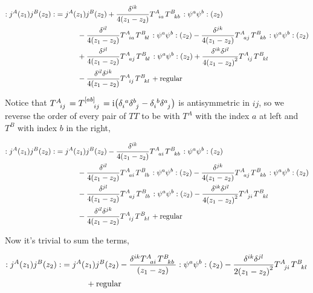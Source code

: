 \begin{align*}
    \cnord{j^A\qty(z_1)j^B\qty(z_2)}&=j^A\qty(z_1)j ^B\qty(z_2)+\frac{\delta^{ik}}{4\qty(z_1-z_2)}\tensor{T}{^A_{ia}}\tensor{T}{^B_{kb}}\cnord{\psi^a\psi^b}\qty(z_2)\\
    &\quad\quad\quad-\frac{\delta^{il}}{4\qty(z_1-z_2)}\tensor{T}{^A_{ia}}\tensor{T}{^B_{bl}}\cnord{\psi^a\psi^b}\qty(z_2)-\frac{\delta^{jk}}{4\qty(z_1-z_2)}\tensor{T}{^A_{aj}}\tensor{T}{^B_{kb}}\cnord{\psi^a\psi^b}\qty(z_2)\\
    &\quad\quad\quad+\frac{\delta^{jl}}{4\qty(z_1-z_2)}\tensor{T}{^A_{aj}}\tensor{T}{^B_{bl}}\cnord{\psi^a\psi^b}\qty(z_2)+\frac{\delta^{ik}\delta^{jl}}{4\qty(z_1-z_2)^2}\tensor{T}{^A_{ij}}\tensor{T}{^B_{kl}}\\
    &\quad\quad\quad-\frac{\delta^{il}\delta^{jk}}{4\qty(z_1-z_2)}\tensor{T}{^A_{ij}}\tensor{T}{^B_{kl}}+\textnormal{regular}
\end{align*}

Notice that $\tensor{T}{^A_{ij}}=\tensor{T}{^{\qty[ab]}_{ij}}=\im\qty(\tensor{\delta}{_i^a}\tensor{\delta}{^b_j}-\tensor{\delta}{_i^b}\tensor{\delta}{^a_j})$ is antisymmetric in $ij$, so we reverse the order of every pair of $TT$ to be with 
$T^A$ with the index $a$ at left and $T^B$ with index $b$ in the right,

\begin{align*}
    \cnord{j^A\qty(z_1)j^B\qty(z_2)}&=j^A\qty(z_1)j ^B\qty(z_2)-\frac{\delta^{ik}}{4\qty(z_1-z_2)}\tensor{T}{^A_{ai}}\tensor{T}{^B_{kb}}\cnord{\psi^a\psi^b}\qty(z_2)\\
    &\quad\quad\quad-\frac{\delta^{il}}{4\qty(z_1-z_2)}\tensor{T}{^A_{ai}}\tensor{T}{^B_{lb}}\cnord{\psi^a\psi^b}\qty(z_2)-\frac{\delta^{jk}}{4\qty(z_1-z_2)}\tensor{T}{^A_{aj}}\tensor{T}{^B_{kb}}\cnord{\psi^a\psi^b}\qty(z_2)\\
    &\quad\quad\quad-\frac{\delta^{jl}}{4\qty(z_1-z_2)}\tensor{T}{^A_{aj}}\tensor{T}{^B_{lb}}\cnord{\psi^a\psi^b}\qty(z_2)-\frac{\delta^{ik}\delta^{jl}}{4\qty(z_1-z_2)^2}\tensor{T}{^A_{ji}}\tensor{T}{^B_{kl}}\\
    &\quad\quad\quad-\frac{\delta^{il}\delta^{jk}}{4\qty(z_1-z_2)}\tensor{T}{^A_{ij}}\tensor{T}{^B_{kl}}+\textnormal{regular}
\end{align*}

Now it's trivial to sum the terms,

\begin{align*}
    \cnord{j^A\qty(z_1)j^B\qty(z_2)}&=j^A\qty(z_1)j ^B\qty(z_2)-\frac{\delta^{ik}\tensor{T}{^A_{ai}}\tensor{T}{^B_{kb}}}{\qty(z_1-z_2)}\cnord{\psi^a\psi^b}\qty(z_2)-\frac{\delta^{ik}\delta^{jl}}{2\qty(z_1-z_2)^2}\tensor{T}{^A_{ji}}\tensor{T}{^B_{kl}}\\
    &\quad\quad\quad+\textnormal{regular}
\end{align*}


